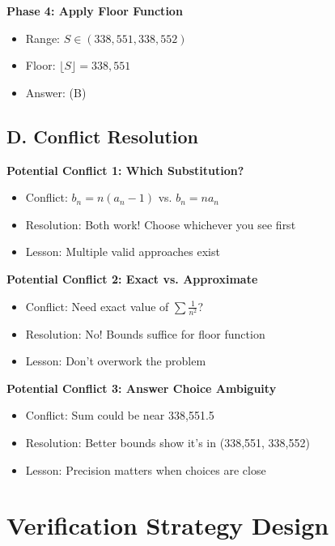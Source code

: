 \documentclass[12pt]{article}
\begin{document}
\begin{techniquesbox}
\textbf{Phase 4: Apply Floor Function}
\begin{itemize}
    \item Range: $S \in (338,551, 338,552)$
    \item Floor: $\lfloor S \rfloor = 338,551$
    \item Answer: (B)
\end{itemize}

\subsection*{D. Conflict Resolution}

\textbf{Potential Conflict 1: Which Substitution?}
\begin{itemize}
    \item Conflict: $b_n = n(a_n-1)$ vs. $b_n = na_n$
    \item Resolution: Both work! Choose whichever you see first
    \item Lesson: Multiple valid approaches exist
\end{itemize}

\textbf{Potential Conflict 2: Exact vs. Approximate}
\begin{itemize}
    \item Conflict: Need exact value of $\sum \frac{1}{n^2}$?
    \item Resolution: No! Bounds suffice for floor function
    \item Lesson: Don't overwork the problem
\end{itemize}

\textbf{Potential Conflict 3: Answer Choice Ambiguity}
\begin{itemize}
    \item Conflict: Sum could be near 338,551.5
    \item Resolution: Better bounds show it's in (338,551, 338,552)
    \item Lesson: Precision matters when choices are close
\end{itemize}

\end{techniquesbox}

\section{Verification Strategy Design}
\end{document}
